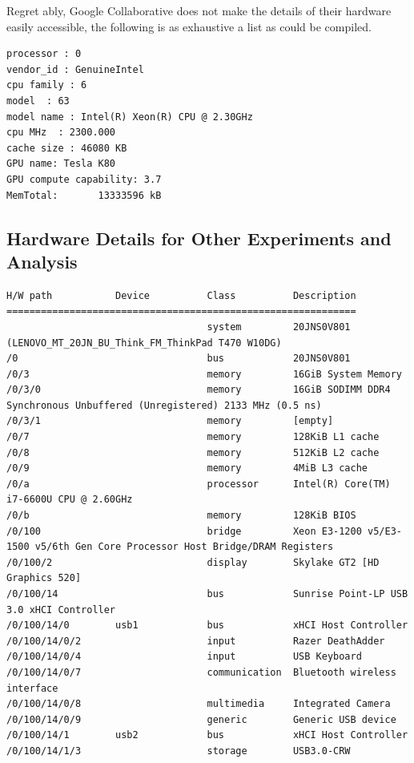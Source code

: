 \documentclass{csfourzero}
\begin{document}
Regret ably, Google Collaborative does not make the details of their hardware easily accessible, the following is as exhaustive a list as could be compiled.

\begin{verbatim}
processor : 0
vendor_id : GenuineIntel
cpu family : 6
model  : 63
model name : Intel(R) Xeon(R) CPU @ 2.30GHz
cpu MHz  : 2300.000
cache size : 46080 KB
GPU name: Tesla K80
GPU compute capability: 3.7
MemTotal:       13333596 kB

\end{verbatim}

\subsection{Hardware Details for Other Experiments and Analysis}

\begin{verbatim}
H/W path           Device          Class          Description
=============================================================
                                   system         20JNS0V801 (LENOVO_MT_20JN_BU_Think_FM_ThinkPad T470 W10DG)
/0                                 bus            20JNS0V801
/0/3                               memory         16GiB System Memory
/0/3/0                             memory         16GiB SODIMM DDR4 Synchronous Unbuffered (Unregistered) 2133 MHz (0.5 ns)
/0/3/1                             memory         [empty]
/0/7                               memory         128KiB L1 cache
/0/8                               memory         512KiB L2 cache
/0/9                               memory         4MiB L3 cache
/0/a                               processor      Intel(R) Core(TM) i7-6600U CPU @ 2.60GHz
/0/b                               memory         128KiB BIOS
/0/100                             bridge         Xeon E3-1200 v5/E3-1500 v5/6th Gen Core Processor Host Bridge/DRAM Registers
/0/100/2                           display        Skylake GT2 [HD Graphics 520]
/0/100/14                          bus            Sunrise Point-LP USB 3.0 xHCI Controller
/0/100/14/0        usb1            bus            xHCI Host Controller
/0/100/14/0/2                      input          Razer DeathAdder
/0/100/14/0/4                      input          USB Keyboard
/0/100/14/0/7                      communication  Bluetooth wireless interface
/0/100/14/0/8                      multimedia     Integrated Camera
/0/100/14/0/9                      generic        Generic USB device
/0/100/14/1        usb2            bus            xHCI Host Controller
/0/100/14/1/3                      storage        USB3.0-CRW
\end{verbatim}
\end{document}
